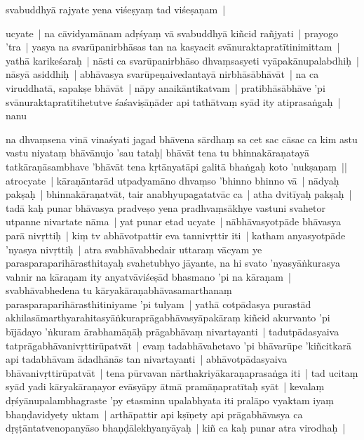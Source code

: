 \documentclass[article,12pt,a4paper]{memoir}%
\newcounter{parCount}
\begin{document}
	  \pstart \leavevmode%
	svabuddhyā rajyate yena viśeṣyaṃ tad viśeṣaṇam | 
	{}
	\pend%
      

	  \pstart \leavevmode%
	ucyate | na cāvidyamānam adṛśyaṃ vā svabuddhyā kiñcid rañjyati | \label{thakur75-120.11} prayogo 'tra | yasya na svarūpanirbhāsas tan na kasyacit svānuraktapratītinimittam | yathā karikeśaraḥ | nāsti ca svarūpanirbhāso dhvaṃsasyeti vyāpakānupalabdhiḥ | nāsyā asiddhiḥ | abhāvasya svarūpeṇaivedantayā nirbhāsābhāvāt | na ca viruddhatā, sapakṣe bhāvāt | nāpy anaikāntikatvam | pratibhāsābhāve 'pi svānuraktapratītihetutve śaśaviṣāṇāder api tathātvaṃ syād ity atiprasaṅgaḥ | \label{thakur75-120.17} nanu
	{}
	\pend%
      

	  \pstart \leavevmode%
	na dhvaṃsena vinā vinaśyati jagad bhāvena sārdhaṃ sa cet sac cāsac ca kim astu vastu niyataṃ bhāvānujo 'sau tataḥ| bhāvāt tena tu bhinnakāraṇatayā tatkāraṇāsambhave 'bhāvāt tena kṛtānyatāpi galitā bhaṅgaḥ koto 'nukṣaṇaṃ ||  \label{thakur75-120.22} atrocyate | kāraṇāntarād utpadyamāno dhvaṃso 'bhinno bhinno vā | \label{thakur75-120.22a} nādyaḥ pakṣaḥ | bhinnakāraṇatvāt, tair anabhyupagatatvāc ca | atha dvitīyaḥ pakṣaḥ | tadā kaḥ punar bhāvasya pradveṣo yena pradhvaṃsākhye vastuni svahetor utpanne nivartate nāma | \label{thakur75-120.25} yat punar etad ucyate | nābhāvasyotpāde bhāvasya parā nivṛttiḥ | kiṃ tv abhāvotpattir eva tannivṛttir iti | katham anyasyotpāde 'nyasya nivṛttiḥ | atra svabhāvabhedair uttaraṃ vācyam ye parasparaparihārasthitayaḥ svahetubhyo jāyante, na hi svato 'nyasyāṅkurasya vahnir na kāraṇam ity anyatvāviśeṣād bhasmano 'pi na kāraṇam | svabhāvabhedena tu kāryakāraṇabhāvasamarthanaṃ parasparaparihārasthitiniyame 'pi tulyam | yathā cotpādasya purastād akhilasāmarthyarahitasyāṅkuraprāgabhāvasyāpakāraṃ kiñcid akurvanto 'pi bījādayo 'ṅkuram ārabhamāṇāḥ prāgabhāvaṃ nivartayanti | tadutpādasyaiva tatprāgabhāvanivṛttirūpatvāt | evaṃ tadabhāvahetavo 'pi bhāvarūpe 'kiñcitkarā api tadabhāvam ādadhānās tan nivartayanti | abhāvotpādasyaiva bhāvanivṛttirūpatvāt | tena pūrvavan nārthakriyākaraṇaprasaṅga iti | \label{thakur75-121.2} tad ucitaṃ syād yadi kāryakāraṇayor evāsyāpy ātmā pramāṇapratītaḥ syāt | kevalaṃ dṛśyānupalambhagraste 'py etasminn upalabhyata iti pralāpo vyaktam iyaṃ bhaṇḍavidyety uktam | \label{thakur75-121.4} arthāpattir api kṣīṇety api prāgabhāvasya ca dṛṣṭāntatvenopanyāso bhaṇḍālekhyanyāyaḥ | \label{thakur75-121.6} kiñ ca kaḥ punar atra virodhaḥ |
	{}
	\pend%
      
\end{document}
